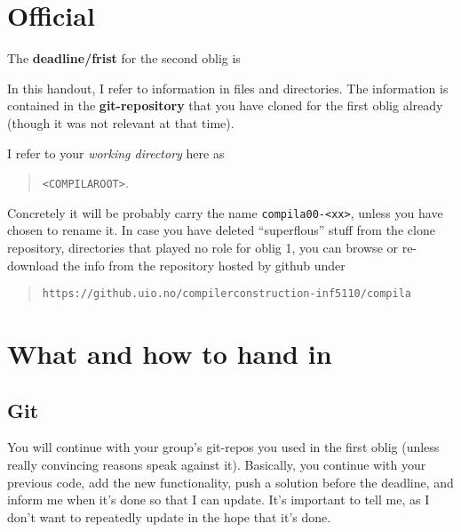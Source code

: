 \documentclass[11pt,freeform]{handout}[2014/08/13]
\begin{document}
\thispagestyle{empty}



\section{Official }
\label{sec:official-info}




\hrulefill{}

The \textbf{deadline/frist}  for the second oblig is

\begin{quote}
  \textbf{\deadlinetwo}
\end{quote}





In this handout, I refer to information in files and directories. The
information is contained in the \textbf{git-repository} that you have
cloned for the first oblig already (though it was not relevant at that
time).

I refer to your \emph{working directory} here as 
\begin{quote}
  \texttt{<COMPILAROOT>}.   
\end{quote}
Concretely it will be probably carry the name \texttt{compila00-<xx>},
unless you have chosen to rename it. In case you have deleted
``superflous'' stuff from the clone repository, directories that played no
role for oblig 1, you can browse or re-download the info from the
repository hosted by github under

\begin{quote}
  \texttt{https://github.uio.no/compilerconstruction-inf5110/compila}
\end{quote}




\section{What and how to hand in}
\label{sec:what-how}


\subsection{Git}
\label{sec:git}

You will continue with your group's git-repos you used in the first oblig
(unless really convincing reasons speak against it).  Basically, you
continue with your previous code, add the new functionality, push a
solution before the deadline, and inform me when it's done so that I can
update. It's important to tell me, as I don't want to repeatedly update in
the hope that it's done.
\end{document}
